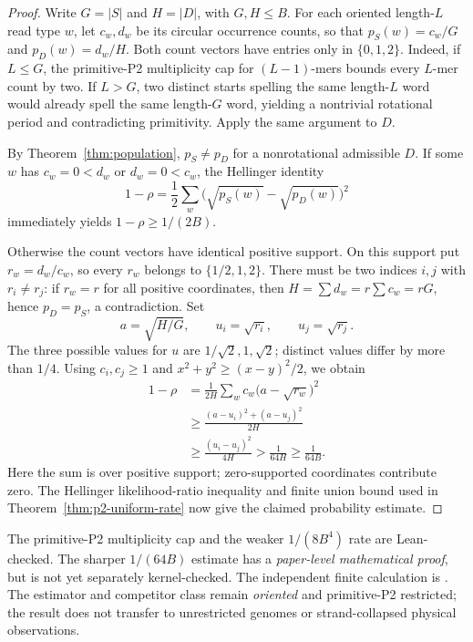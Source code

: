 \begin{proof}
Write $G=|S|$ and $H=|D|$, with $G,H\le B$.
For each oriented length-$L$ read type $w$, let $c_w,d_w$
be its circular occurrence counts, so that
$p_S(w)=c_w/G$ and $p_D(w)=d_w/H$.
Both count vectors have entries only in $\{0,1,2\}$.
Indeed, if $L\le G$, the primitive-P2 multiplicity
cap for $(L-1)$-mers bounds every $L$-mer count by two.
If $L>G$, two distinct starts spelling the same length-$L$
word would already spell the same length-$G$ word,
yielding a nontrivial rotational period and contradicting
primitivity. Apply the same argument to $D$.

By Theorem~\ref{thm:population}, $p_S\ne p_D$ for
a nonrotational admissible $D$.
If some $w$ has $c_w=0<d_w$ or $d_w=0<c_w$,
the Hellinger identity
\[
  1-\rho=\frac12\sum_w
       \bigl(\sqrt{p_S(w)}-\sqrt{p_D(w)}\bigr)^2
\]
immediately yields $1-\rho\ge1/(2B)$.

Otherwise the count vectors have identical positive
support. On this support put $r_w=d_w/c_w$, so every
$r_w$ belongs to $\{1/2,1,2\}$.
There must be two indices $i,j$ with $r_i\ne r_j$:
if $r_w=r$ for all positive coordinates, then
$H=\sum d_w=r\sum c_w=rG$, hence
$p_D=p_S$, a contradiction.
Set
\[
 a=\sqrt{H/G},\qquad
 u_i=\sqrt{r_i},\qquad u_j=\sqrt{r_j}.
\]
The three possible values for $u$ are
$1/\sqrt2,1,\sqrt2$; distinct values differ
by more than $1/4$.
Using $c_i,c_j\ge1$ and
$x^2+y^2\ge(x-y)^2/2$, we obtain
\[
\begin{aligned}
1-\rho
 &= \frac{1}{2H}\sum_w c_w
       \bigl(a-\sqrt{r_w}\bigr)^2 \\
 &\ge\frac{(a-u_i)^2+(a-u_j)^2}{2H}\\
 &\ge\frac{(u_i-u_j)^2}{4H}
  >\frac{1}{64H}\ge\frac{1}{64B}.
\end{aligned}
\]
Here the sum is over positive support; zero-supported
coordinates contribute zero. The Hellinger
likelihood-ratio inequality and finite union bound
used in Theorem~\ref{thm:p2-uniform-rate}
now give the claimed probability estimate.
\end{proof}

The primitive-P2 multiplicity cap and the weaker
$1/(8B^4)$ rate are Lean-checked. The sharper
$1/(64B)$ estimate has a \emph{paper-level mathematical
proof}, but is not yet separately kernel-checked.
The independent finite calculation is
.
The estimator and competitor class remain
\emph{oriented} and primitive-P2 restricted;
the result does not transfer to unrestricted genomes
or strand-collapsed physical observations.

